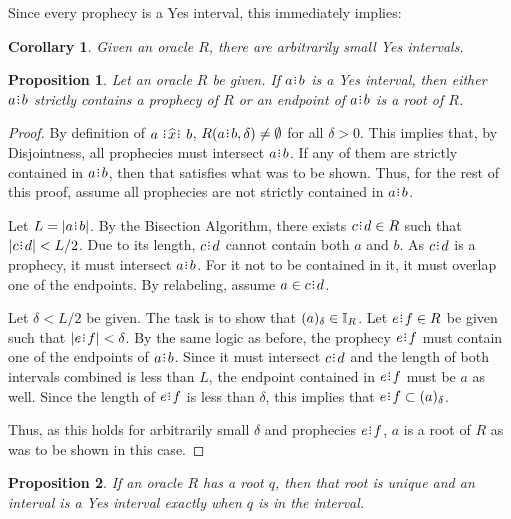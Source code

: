 \documentclass[12pt]{article}
\newtheorem{corollary}{Corollary}[section]
\newtheorem{proposition}{Proposition}[section]
\begin{document}
Since every prophecy is a Yes interval, this immediately implies: 
\begin{corollary}
    Given an oracle $R$, there are arbitrarily small Yes intervals. 
\end{corollary}



\begin{proposition}\label{os-yescat}
    Let an oracle $R$ be given. If $a\rint b$ is a Yes interval, then either $a\rint b$ strictly contains a prophecy of $R$ or an endpoint of $a\rint b$ is a root of $R$. 
\end{proposition}

\begin{proof}
    By definition of $a \xora b$, $R(a\rint b, \delta) \neq \emptyset$ for all $\delta > 0$. This implies that, by Disjointness, all prophecies must intersect $a\rint b$. If any of them are strictly contained in $a\rint b$, then that satisfies what was to be shown. Thus, for the rest of this proof, assume all prophecies are not strictly contained in $a\rint b$.

    Let $L = |a\rint b|$. By the Bisection Algorithm, there exists $c\rint d \in R$ such that $|c\rint d| < L/2$. Due to its length, $c\rint d$ cannot contain both $a$ and $b$. As $c\rint d$ is a prophecy, it must intersect $a\rint b$. For it not to be contained in it, it must overlap one of the endpoints. By relabeling, assume $a \in c\rint d$.
    
    Let $\delta < L/2$ be given. The task is to show that $(a)_{\delta} \in \mathbb{I}_R$. Let $e\rint f \in R$ be given such that $|e\rint f| < \delta$. By the same logic as before, the prophecy $e\rint f$ must contain one of the endpoints of $a\rint b$. Since it must intersect $c\rint d$ and the length of both intervals combined is less than $L$, the endpoint contained in $e\rint f$ must be $a$ as well. Since the length of $e\rint f$ is less than $\delta$, this implies that $e\rint f \subset \halo{a}$.

    Thus, as this holds for arbitrarily small $\delta$ and prophecies $e\rint f$, $a$ is a root of $R$ as was to be shown in this case. 
\end{proof}

\begin{proposition}\label{os-singular}
    If an oracle $R$ has a root $q$, then that root is unique and an interval is a Yes interval exactly when $q$ is in the interval.
\end{proposition}
\end{document}
